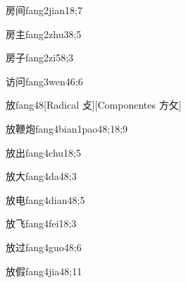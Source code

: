 \begin{verbete}{房间}{fang2jian1}{8;7}
\end{verbete}

\begin{verbete}{房主}{fang2zhu3}{8;5}
\end{verbete}

\begin{verbete}{房子}{fang2zi5}{8;3}
\end{verbete}

\begin{verbete}{访问}{fang3wen4}{6;6}
\end{verbete}

\begin{verbete}{放}{fang4}{8}[Radical 攴][Componentes 方攵]
\end{verbete}

\begin{verbete}{放鞭炮}{fang4bian1pao4}{8;18;9}
\end{verbete}

\begin{verbete}{放出}{fang4chu1}{8;5}
\end{verbete}

\begin{verbete}{放大}{fang4da4}{8;3}
\end{verbete}

\begin{verbete}{放电}{fang4dian4}{8;5}
\end{verbete}

\begin{verbete}{放飞}{fang4fei1}{8;3}
\end{verbete}

\begin{verbete}{放过}{fang4guo4}{8;6}
\end{verbete}

\begin{verbete}{放假}{fang4jia4}{8;11}
\end{verbete}

